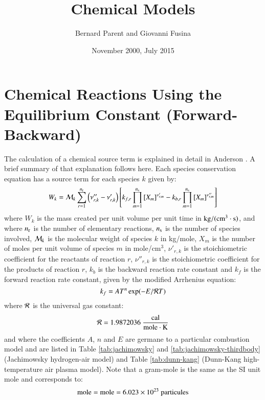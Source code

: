 \documentclass{warpdoc}
\author{
  Bernard Parent and Giovanni Fusina
}
\title{Chemical Models
}
\date{
  November 2000, July 2015
}
\newcommand{\ns}{{{n}_{\rm s}}}
\newcommand{\nr}{{{n}_{\rm r}}}
\begin{document}
  \pagestyle{headings}
  \setcounter{page}{1}
  \makewarpdoctitle
  \tableofcontents
  \listoftables



\section{Chemical Reactions Using the Equilibrium Constant (Forward-Backward)}



The calculation of a chemical source term is explained in detail in Anderson \cite{book:1989:anderson}.
A brief summary of that explanation follows here.
Each species conservation equation has a source term for each species $k$ given by:
%
\begin{equation}
W_k = {\cal M}_k \sum_{r=1}^{\nr} \left( \nu''_{r,k} - \nu'_{r,k} \right)
\left[ k_{f,r} \prod_{m=1}^{\ns} \left[ X_m \right]^{\nu'_{r,m}}
- k_{b,r} \prod_{m=1}^{\ns} \left[ X_m \right]^{\nu''_{r,m}} \right]
\end{equation}
%
where $W_k$ is the mass created per unit volume per unit time in $\rm kg/(cm^3\cdot s)$, and where $\nr$ is the number of elementary reactions, $\ns$ is the number of species involved, ${\cal M}_k$ is the molecular weight of species $k$ in kg/mole, $X_m$ is the number of moles per unit volume of species $m$ in mole/cm$^3$, $\nu'_{r,k}$ is the stoichiometric coefficient for the reactants of reaction $r$, $\nu''_{r,k}$ is the stoichiometric coefficient for the products of reaction $r$, $k_b$ is the backward reaction rate constant and
$k_f$ is the forward reaction rate constant, given by the
modified Arrhenius equation:
%
\begin{equation}
k_f = AT^n \exp(-E/{\cal R}T)
\end{equation}
%
where $\cal R$ is the universal gas constant:
%
\begin{equation}
 {\cal R}=1.9872036 ~\frac{\rm cal}{\rm mole\cdot K}
\end{equation}
%
and where the coefficients $A$, $n$ and $E$ are germane to a particular combustion
model and are listed in  Table \ref{tab:jachimowsky} and \ref{tab:jachimowsky-thirdbody} (Jachimowsky hydrogen-air model) and Table \ref{tab:dunn-kang} (Dunn-Kang high-temperature air plasma model). Note that a gram-mole is the same as the SI unit mole and corresponds to:
%
\begin{equation}
{\rm mole}={\rm mole}=6.023 \times 10^{23}~{\rm particules}
\end{equation}
%
\end{document}
